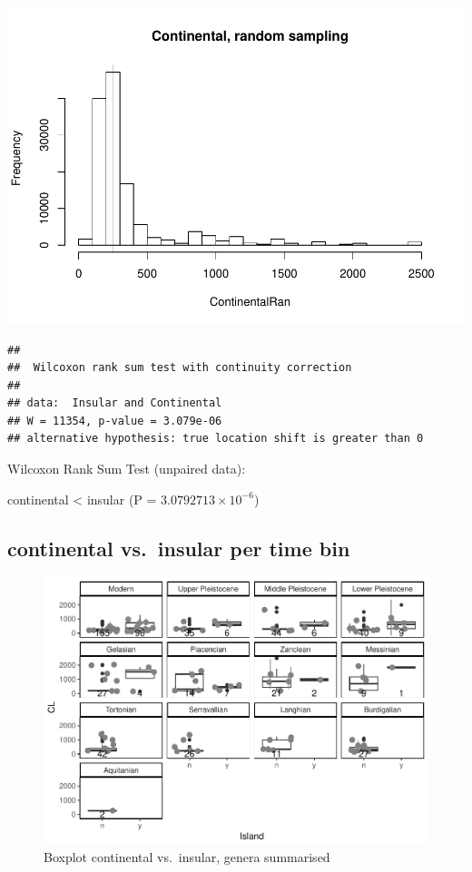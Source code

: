\documentclass[]{article}
\begin{document}
\includegraphics{MA_JJ_files/figure-latex/randon sampling island continental-1.pdf}

\begin{verbatim}
## 
##  Wilcoxon rank sum test with continuity correction
## 
## data:  Insular and Continental
## W = 11354, p-value = 3.079e-06
## alternative hypothesis: true location shift is greater than 0
\end{verbatim}

Wilcoxon Rank Sum Test (unpaired data):

continental \textless{} insular (P = \(3.0792713\times 10^{-6}\))

\newpage

\subsection{continental vs.~insular per time
bin}\label{continental-vs.insular-per-time-bin-1}

\begin{figure}[htbp]
\centering
\includegraphics{MA_JJ_files/figure-latex/Boxplot continental vs. insular, split into time bins-1.pdf}
\caption{Boxplot continental vs.~insular, genera summarised}
\end{figure}
\end{document}

